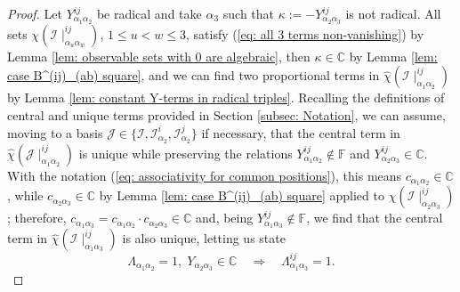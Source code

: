 \documentclass[10pt]{article}
\theoremstyle{remark}%
\theoremstyle{definition}%
\begin{document}
\begin{proof}
Let $Y_{\alpha_{1}\alpha_{2}}^{ij}$ be radical and take $\alpha_{3}$ such that $\kappa:=-Y_{\alpha_{2}\alpha_{3}}^{ij}$ is not radical. All sets $\chi(\mathcal{I}\mid_{\alpha_{u}\alpha_{w}}^{ij})$, $1\leq u<w\leq 3$, satisfy (\ref{eq: all 3 terms non-vanishing}) by Lemma \ref{lem: observable sets with 0 are algebraic}, then $\kappa\in\mathbb{C}$ by Lemma \ref{lem: case B^(ij)_(ab) square}, and we can find two proportional terms in $\hat{\chi}(\mathcal{I}\mid_{\alpha_{1}\alpha_{2}}^{ij})$ by Lemma \ref{lem: constant Y-terms in radical triples}.
Recalling the definitions of central and unique terms provided in Section \ref{subsec: Notation}, we can assume, moving to a basis $\mathcal{J}\in\{\mathcal{I},\mathcal{I}_{\alpha_{2}}^{i},\mathcal{I}_{\alpha_{2}}^{j}\}$ if necessary, that the central term in $\hat{\chi}(\mathcal{J}\mid_{\alpha_{1}\alpha_{2}}^{ij})$ is unique while preserving the relations $Y_{\alpha_{1}\alpha_{2}}^{ij}\notin \mathbb{F}$ and $Y_{\alpha_{2}\alpha_{3}}^{ij}\in\mathbb{C}$. With the notation (\ref{eq: associativity for common positions}), 
this means $c_{\alpha_{1}\alpha_{2}}\in\mathbb{C}$, while $c_{\alpha_{2}\alpha_{3}}\in\mathbb{C}$ by Lemma \ref{lem: case B^(ij)_(ab) square} applied to $\chi(\mathcal{I}\mid_{\alpha_{2}\alpha_{3}}^{ij})$; therefore, $c_{\alpha_{1}\alpha_{3}}=c_{\alpha_{1}\alpha_{2}}\cdot c_{\alpha_{2}\alpha_{3}}\in\mathbb{C}$ and, being $Y_{\alpha_{1}\alpha_{3}}^{ij}\notin\mathbb{F}$, we find that the central term in $\hat{\chi}(\mathcal{I}\mid_{\alpha_{1}\alpha_{3}}^{ij})$ is also unique, letting us state  
 \begin{equation}
    \Lambda_{\alpha_{1}\alpha_{2}}=1,\; Y_{\alpha_{2}\alpha_{3}}\in\mathbb{C} \quad \Rightarrow \quad %
    \Lambda_{\alpha_{1}\alpha_{3}}^{ij}=1. 
    \label{eq: proportionality preserves centering}
 \end{equation}

\end{proof}
\end{document}
